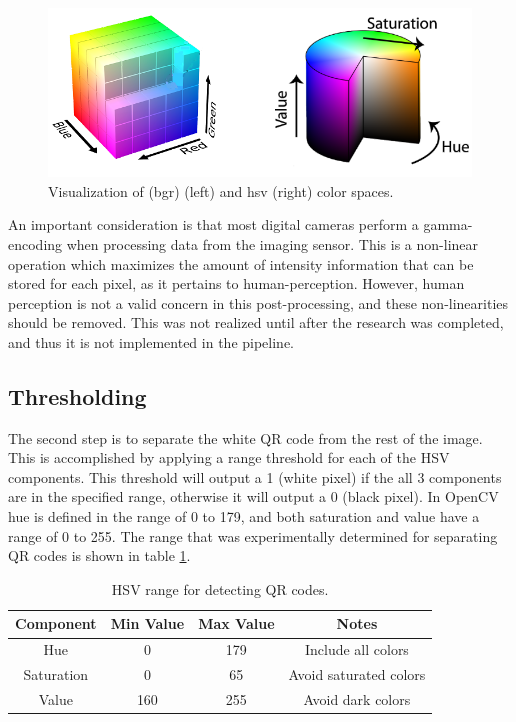 \begin{figure}[htb]
	\centering
    \includegraphics[width=5.5in]{figures/bgr_and_hsv.png}
    \caption[Color spaces]{Visualization of \ac{(bgr)} (left) and \ac{hsv} (right) color spaces.}
    \label{figure:color_spaces}
\end{figure} 

An important consideration is that most digital cameras perform a gamma-encoding when processing data from the imaging sensor.  This is a non-linear operation which maximizes the amount of intensity information that can be stored for each pixel, as it pertains to human-perception.  However, human perception is not a valid concern in this post-processing, and these non-linearities should be removed.  This was not realized until after the research was completed, and thus it is not implemented in the pipeline.

\subsection{Thresholding}
\label{section:qr_thresholding}

The second step is to separate the white QR code from the rest of the image.  This is accomplished by applying a range threshold for each of the HSV components.  This threshold will output a 1 (white pixel) if the all 3 components are in the specified range, otherwise it will output a 0 (black pixel).  In OpenCV hue is defined in the range of 0 to 179, and both saturation and value have a range of 0 to 255.  The range that was experimentally determined for separating QR codes is shown in table \ref{table:qr_hsv_ranges}.

\begin{table}[htb]
    \begin{center}
    \caption[QR Code Detection Values]{HSV range for detecting QR codes.}
    \begin{tabular}[c]{|c|c|c|c|}
        \hline
        Component & Min Value & Max Value & Notes \\
        \hline
        Hue        & 0   & 179 & Include all colors      \\
        Saturation & 0   & 65  & Avoid saturated colors  \\
        Value      & 160 & 255 & Avoid dark colors       \\
        \hline
    \end{tabular}
    \label{table:qr_hsv_ranges}
   \end{center}
\end{table}

